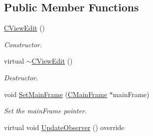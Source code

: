 \subsection*{Public Member Functions}
\begin{DoxyCompactItemize}
\item 
\hypertarget{class_c_view_edit_a99fea37450207a1ffe8cf6b46ec2a11f}{\hyperlink{class_c_view_edit_a99fea37450207a1ffe8cf6b46ec2a11f}{C\+View\+Edit} ()}\label{class_c_view_edit_a99fea37450207a1ffe8cf6b46ec2a11f}

\begin{DoxyCompactList}\small\item\em Constructor. \end{DoxyCompactList}\item 
\hypertarget{class_c_view_edit_a968f16ef61489033c80ebe504017db3a}{virtual \hyperlink{class_c_view_edit_a968f16ef61489033c80ebe504017db3a}{$\sim$\+C\+View\+Edit} ()}\label{class_c_view_edit_a968f16ef61489033c80ebe504017db3a}

\begin{DoxyCompactList}\small\item\em Destructor. \end{DoxyCompactList}\item 
void \hyperlink{class_c_view_edit_a28bb793d43baba78e9b1c704b4f0e128}{Set\+Main\+Frame} (\hyperlink{class_c_main_frame}{C\+Main\+Frame} $\ast$main\+Frame)
\begin{DoxyCompactList}\small\item\em Set the main\+Frame pointer. \end{DoxyCompactList}\item 
\hypertarget{class_c_view_edit_ac2b73f20fe10a4a98096facde6450e5a}{virtual void \hyperlink{class_c_view_edit_ac2b73f20fe10a4a98096facde6450e5a}{Update\+Observer} () override}\label{class_c_view_edit_ac2b73f20fe10a4a98096facde6450e5a}


\end{DoxyCompactItemize}

